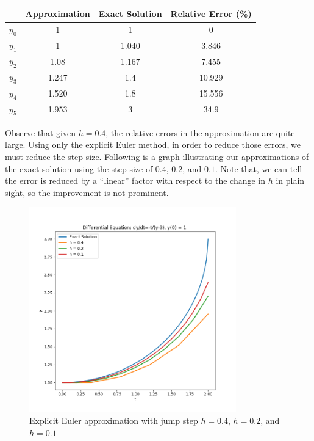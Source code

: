 \documentclass[a4paper]{article}
\numberwithin{equation}{section}
\begin{document}
\begin{table}[H]
  \centering
  \begin{tabular}{@{}lSSS@{}}
    \toprule
    {}      & {Approximation} & {Exact Solution} & {Relative Error (\%)} \\
    \midrule
    \( y_0 \) & 1               & 1                & 0                     \\
    \( y_1 \) & 1               & 1.040            & 3.846                 \\
    \( y_2 \) & 1.08            & 1.167            & 7.455                 \\
    \( y_3 \) & 1.247           & 1.4              & 10.929                \\
    \( y_4 \) & 1.520           & 1.8              & 15.556                \\
    \( y_5 \) & 1.953           & 3                & 34.9                  \\
    \bottomrule
  \end{tabular}
\end{table}

Observe that given \( h = 0.4 \), the relative errors in the approximation are quite large. Using only the explicit Euler method, in order to reduce those errors, we must reduce the step size. Following is a graph illustrating our approximations of the exact solution using the step size of \( 0.4 \), \( 0.2 \), and \( 0.1 \). Note that, we can tell the error is reduced by a ``linear'' factor with respect to the change in \( h \) in plain sight, so the improvement is not prominent.

\begin{figure}[H]
  \centering
  \includegraphics[width=0.8\textwidth]{plot_euler.png}
  \caption{Explicit Euler approximation with jump step \( h = 0.4 \), \( h = 0.2 \), and \( h = 0.1 \)}
\end{figure}
\end{document}
